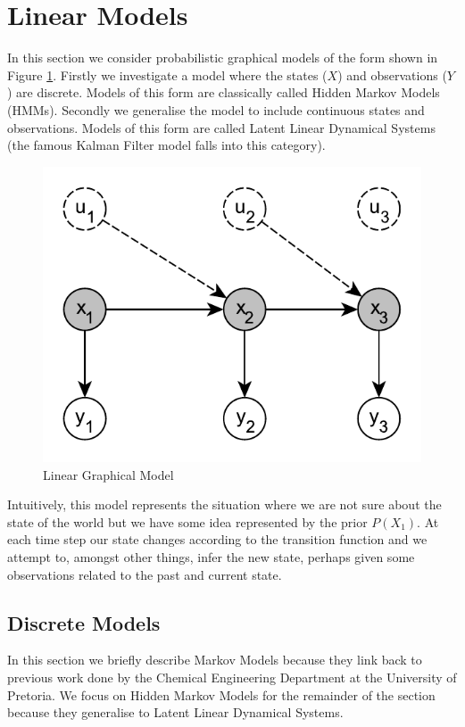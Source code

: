 \documentclass[../masters.tex]{subfiles}
\begin{document}
\graphicspath{{./imgs/}{../imgs/}} %

\section{Linear Models}
In this section we consider probabilistic graphical models of the form shown in Figure \ref{fig_linmod}. Firstly we investigate a model where the states ($X$) and observations ($Y$) are discrete. Models of this form are classically called Hidden Markov Models (HMMs). Secondly we generalise the model to include continuous states and observations. Models of this form are called Latent Linear Dynamical Systems (the famous Kalman Filter model falls into this category).
\begin{figure}[H] 
\centering
\includegraphics[scale=1.0]{linear_model.pdf}
\caption{Linear Graphical Model}
\label{fig_linmod}
\end{figure}
Intuitively, this model represents the situation where we are not sure about the state of the world but we have some idea represented by the prior $P(X_1)$. At each time step our state changes according to the transition function and we attempt to, amongst other things, infer the new state, perhaps given some observations related to the past and current state.

\subsection{Discrete Models}
In this section we briefly describe Markov Models because they link back to previous work done by the Chemical Engineering Department at the University of Pretoria. We focus on Hidden Markov Models for the remainder of the section because they generalise to Latent Linear Dynamical Systems. 
\end{document}
